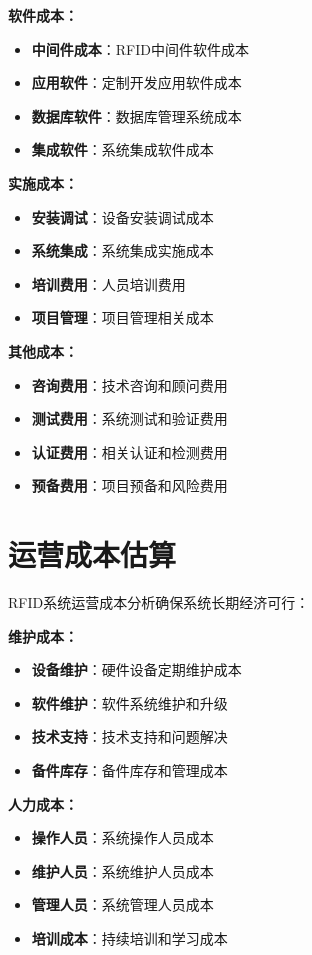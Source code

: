 \documentclass[12pt,UTF8]{ctexbook}
\begin{document}
\begin{itemize}[leftmargin=3.5em]
\begin{itemize}[leftmargin=3.5em]
\begin{itemize}[leftmargin=3.5em]
\begin{itemize}[leftmargin=3.5em]
\textbf{软件成本：}
\begin{itemize}[leftmargin=3.5em]
    \item \textbf{中间件成本}：RFID中间件软件成本
    \item \textbf{应用软件}：定制开发应用软件成本
    \item \textbf{数据库软件}：数据库管理系统成本
    \item \textbf{集成软件}：系统集成软件成本
\end{itemize}

\textbf{实施成本：}
\begin{itemize}[leftmargin=3.5em]
    \item \textbf{安装调试}：设备安装调试成本
    \item \textbf{系统集成}：系统集成实施成本
    \item \textbf{培训费用}：人员培训费用
    \item \textbf{项目管理}：项目管理相关成本
\end{itemize}

\textbf{其他成本：}
\begin{itemize}[leftmargin=3.5em]
    \item \textbf{咨询费用}：技术咨询和顾问费用
    \item \textbf{测试费用}：系统测试和验证费用
    \item \textbf{认证费用}：相关认证和检测费用
    \item \textbf{预备费用}：项目预备和风险费用
\end{itemize}

\section{运营成本估算}

RFID系统运营成本分析确保系统长期经济可行：

\textbf{维护成本：}
\begin{itemize}[leftmargin=3.5em]
    \item \textbf{设备维护}：硬件设备定期维护成本
    \item \textbf{软件维护}：软件系统维护和升级
    \item \textbf{技术支持}：技术支持和问题解决
    \item \textbf{备件库存}：备件库存和管理成本
\end{itemize}

\textbf{人力成本：}
\begin{itemize}[leftmargin=3.5em]
    \item \textbf{操作人员}：系统操作人员成本
    \item \textbf{维护人员}：系统维护人员成本
    \item \textbf{管理人员}：系统管理人员成本
    \item \textbf{培训成本}：持续培训和学习成本
\end{itemize}


\end{itemize}
\end{itemize}
\end{itemize}
\end{itemize}
\end{document}
